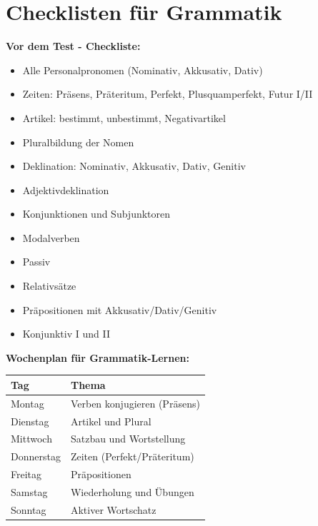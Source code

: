\section{Checklisten für Grammatik}

\bigskip
\noindent\textbf{Vor dem Test - Checkliste:}

\begin{itemize}
    \item [ ] Alle Personalpronomen (Nominativ, Akkusativ, Dativ)
    \item [ ] Zeiten: Präsens, Präteritum, Perfekt, Plusquamperfekt, Futur I/II
    \item [ ] Artikel: bestimmt, unbestimmt, Negativartikel
    \item [ ] Pluralbildung der Nomen
    \item [ ] Deklination: Nominativ, Akkusativ, Dativ, Genitiv
    \item [ ] Adjektivdeklination
    \item [ ] Konjunktionen und Subjunktoren
    \item [ ] Modalverben
    \item [ ] Passiv
    \item [ ] Relativsätze
    \item [ ] Präpositionen mit Akkusativ/Dativ/Genitiv
    \item [ ] Konjunktiv I und II
\end{itemize}

\bigskip
\noindent\textbf{Wochenplan für Grammatik-Lernen:}

\bigskip
\begin{center}
\begin{tabular}{|l|l|}
\hline
Tag & Thema \\ \hline
Montag & Verben konjugieren (Präsens) \\ \hline
Dienstag & Artikel und Plural \\ \hline
Mittwoch & Satzbau und Wortstellung \\ \hline
Donnerstag & Zeiten (Perfekt/Präteritum) \\ \hline
Freitag & Präpositionen \\ \hline
Samstag & Wiederholung und Übungen \\ \hline
Sonntag & Aktiver Wortschatz \\ \hline
\end{tabular}
\end{center}

\chapterend